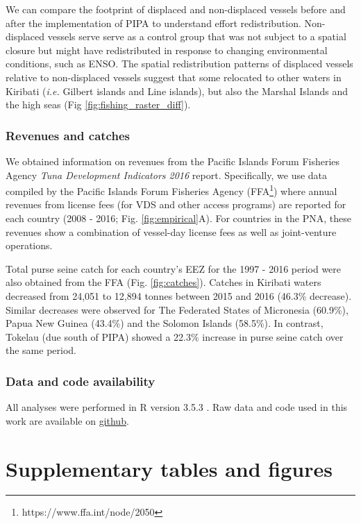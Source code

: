 \documentclass[12pt]{article}
\begin{document}
We can compare the footprint of displaced and non-displaced vessels before and after the implementation of PIPA to understand effort redistribution. Non-displaced vessels serve serve as a control group that was not subject to a spatial closure but might have redistributed in response to changing environmental conditions, such as ENSO. The spatial redistribution patterns of displaced vessels relative to non-displaced vessels suggest that some relocated to other waters in Kiribati (\emph{i.e.} Gilbert islands and Line islands), but also the Marshal Islands and the high seas (Fig \ref{fig:fishing_raster_diff}).


\subsubsection{Revenues and catches}

We obtained information on revenues from the Pacific Islands Forum Fisheries Agency \emph{Tuna Development Indicators 2016} report.  Specifically, we use data compiled by the Pacific Islands Forum Fisheries Agency (FFA\footnote{https://www.ffa.int/node/2050}) where annual revenues from license fees (for VDS and other access programs) are reported for each country (2008 - 2016; Fig. \ref{fig:empirical}A). For countries in the PNA, these revenues show a combination of vessel-day license fees as well as joint-venture operations.

Total purse seine catch for each country's EEZ for the 1997 - 2016 period were also obtained from the FFA (Fig. \ref{fig:catches}). Catches in Kiribati waters decreased from 24,051 to 12,894 tonnes between 2015 and 2016 (46.3\% decrease). Similar decreases were observed for The Federated States of Micronesia (60.9\%), Papua New Guinea (43.4\%) and the Solomon Islands (58.5\%). In contrast, Tokelau (due south of PIPA) showed a 22.3\% increase in purse seine catch over the same period.

\subsubsection{Data and code availability}

All analyses were performed in R version 3.5.3 \cite{rcore_2018}. Raw data and code used in this work are available on \href{https://github.com/jcvdav/MPA_displacement}{github}.

\clearpage

\FloatBarrier

\section{Supplementary tables and figures}
\end{document}
